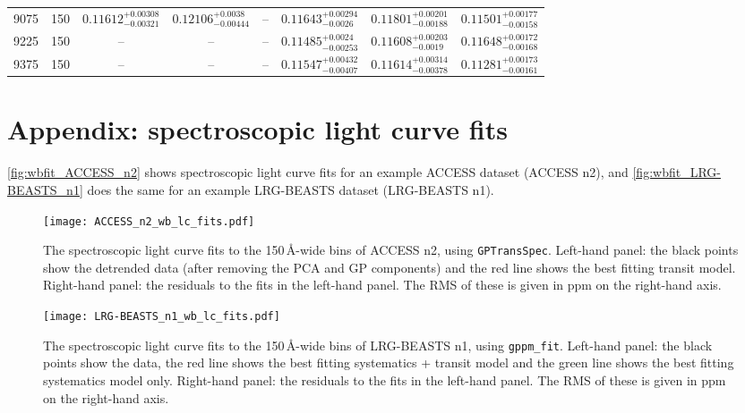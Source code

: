 \documentclass[twocolumn]{aastex63}
\newcommand{\gppmfit}{\texttt{gppm\_fit}}
\begin{document}
\begin{table*}[ht!]
\begin{tabular}{cccccccc}
9075     &      150 &  $0.11612^{+0.00308}_{-0.00321}$ &   $0.12106^{+0.0038}_{-0.00444}$ &                              -- &   $0.11643^{+0.00294}_{-0.0026}$ &  $0.11801^{+0.00201}_{-0.00188}$ &  $0.11501^{+0.00177}_{-0.00158}$ \\
9225     &      150 &                              -- &                              -- &                              -- &   $0.11485^{+0.0024}_{-0.00253}$ &   $0.11608^{+0.00203}_{-0.0019}$ &  $0.11648^{+0.00172}_{-0.00168}$ \\
9375     &      150 &                              -- &                              -- &                              -- &  $0.11547^{+0.00432}_{-0.00407}$ &  $0.11614^{+0.00314}_{-0.00378}$ &  $0.11281^{+0.00173}_{-0.00161}$ \\ \hline
\end{tabular}
\end{table*}





\section{Appendix: spectroscopic light curve fits}

\autoref{fig:wbfit_ACCESS_n2} shows spectroscopic light curve fits for an example ACCESS dataset (ACCESS n2), and \autoref{fig:wbfit_LRG-BEASTS_n1} does the same for an example LRG-BEASTS dataset (LRG-BEASTS n1).

\begin{figure}[ht!]
    \centering
    \texttt{[image: ACCESS\_n2\_wb\_lc\_fits.pdf]}
    \caption{The spectroscopic light curve fits to the 150\,\AA-wide bins of ACCESS n2, using \texttt{GPTransSpec}. Left-hand panel: the black points show the detrended data (after removing the PCA and GP components) and the red line shows the best fitting transit model. Right-hand panel: the residuals to the fits in the left-hand panel. The RMS of these is given in ppm on the right-hand axis.}
    \label{fig:wbfit_ACCESS_n2}
\end{figure}

\begin{figure}[ht!]
    \centering
    \texttt{[image: LRG-BEASTS\_n1\_wb\_lc\_fits.pdf]}
    \caption{The spectroscopic light curve fits to the 150\,\AA-wide bins of LRG-BEASTS n1, using \gppmfit{}. Left-hand panel: the black points show the data, the red line shows the best fitting systematics + transit model and the green line shows the best fitting systematics model only. Right-hand panel: the residuals to the fits in the left-hand panel. The RMS of these is given in ppm on the right-hand axis.}
    \label{fig:wbfit_LRG-BEASTS_n1}
\end{figure}
\end{document}
